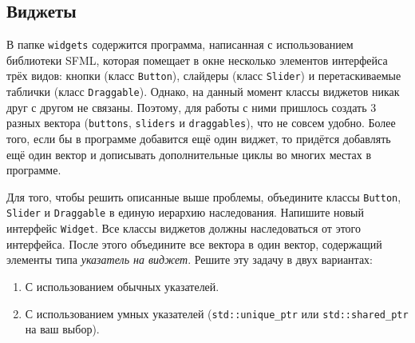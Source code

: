 \documentclass{article}
\begin{document}
\subsection{Виджеты}
В папке \texttt{widgets} содержится программа, написанная с использованием библиотеки SFML, которая помещает в окне несколько элементов интерфейса трёх видов: кнопки (класс \texttt{Button}), слайдеры (класс \texttt{Slider}) и перетаскиваемые таблички (класс \texttt{Draggable}). Однако, на данный момент классы виджетов никак друг с другом не связаны. Поэтому, для работы с ними пришлось создать 3 разных вектора (\texttt{buttons}, \texttt{sliders} и \texttt{draggables}), что не совсем удобно. Более того, если бы в программе добавится ещё один виджет, то придётся добавлять ещё один вектор и дописывать дополнительные циклы во многих местах в программе.

Для того, чтобы решить описанные выше проблемы, объедините классы \texttt{Button}, \texttt{Slider} и \texttt{Draggable} в единую иерархию наследования. Напишите новый интерфейс \texttt{Widget}. Все классы виджетов должны наследоваться от этого интерфейса. После этого объедините все вектора в один вектор, содержащий элементы типа \textit{указатель на виджет}. Решите эту задачу в двух вариантах:

\begin{enumerate}
\item С использованием обычных указателей.
\item С использованием умных указателей (\texttt{std::unique\_ptr} или \texttt{std::shared\_ptr} на ваш выбор).
\end{enumerate}

\newpage
\end{document}
